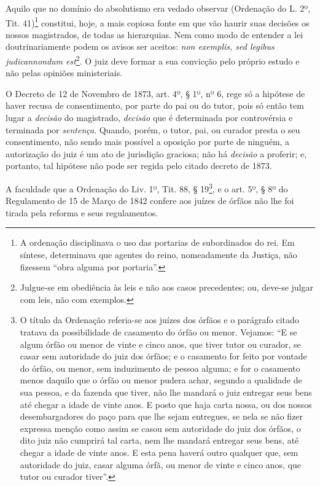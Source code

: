 Aquilo que no domínio do absolutismo era vedado observar (Ordenação do
L. 2º, Tit. 41)\footnote{A ordenação disciplinava o uso das portarias de
  subordinados do rei. Em síntese, determinava que agentes do reino,
  nomeadamente da Justiça, não fizessem ``obra alguma por portaria''.}
constitui, hoje, a mais copiosa fonte em que vão haurir suas decisões os
nossos magistrados, de todas as hierarquias. Nem como modo de entender a
lei doutrinariamente podem os avisos ser aceitos: \emph{non exemplis,
sed legibus judicannondum est}\footnote{Julgue-se em obediência às leis
  e não aos casos precedentes; ou, deve-se julgar com leis, não com
  exemplos.}. O juiz deve formar a sua convicção pelo próprio estudo e
não pelas opiniões ministeriais.

O Decreto de 12 de Novembro de 1873, art. 4º, § 1º, nº 6, rege só a
hipótese de haver recusa de consentimento, por parte do pai ou do tutor,
pois só então tem lugar a \emph{decisão} do magistrado, \emph{decisão}
que é determinada por controvérsia e terminada por \emph{sentença}.
Quando, porém, o tutor, pai, ou curador presta o seu consentimento, não
sendo mais possível a oposição por parte de ninguém, a autorização do
juiz é um ato de jurisdição graciosa; não há \emph{decisão} a proferir;
e, portanto, tal hipótese não pode ser regida pelo citado decreto de
1873.

A faculdade que a Ordenação do Liv. 1º, Tit. 88, § 19\footnote{O título
  da Ordenação referia-se aos juízes dos órfãos e o parágrafo citado
  tratava da possibilidade de casamento do órfão ou menor. Vejamos: ``E
  se algum órfão ou menor de vinte e cinco anos, que tiver tutor ou
  curador, se casar sem autoridade do juiz dos órfãos; e o casamento for
  feito por vontade do órfão, ou menor, sem induzimento de pessoa
  alguma; e for o casamento menos daquilo que o órfão ou menor pudera
  achar, segundo a qualidade de sua pessoa, e da fazenda que tiver, não
  lhe mandará o juiz entregar seus bens até chegar a idade de vinte
  anos. E posto que haja carta nossa, ou dos nossos desembargadores do
  paço para que lhe sejam entregues, se nela se não fizer expressa
  menção como assim se casou sem autoridade do juiz dos órfãos, o dito
  juiz não cumprirá tal carta, nem lhe mandará entregar seus bens, até
  chegar a idade de vinte anos. E esta pena haverá outro qualquer que,
  sem autoridade do juiz, casar alguma órfã, ou menor de vinte e cinco
  anos, que tutor ou curador tiver''.}, e o art. 5º, § 8º do Regulamento
de 15 de Março de 1842 confere aos juízes de órfãos não lhe foi tirada
pela reforma e seus regulamentos.

